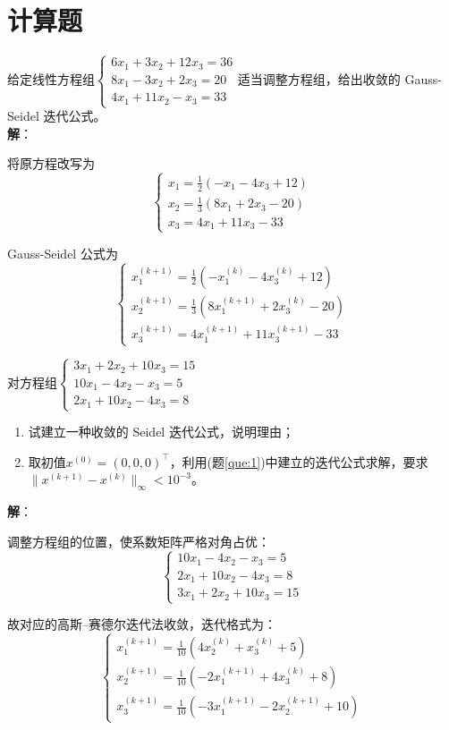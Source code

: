 \documentclass[UTF8,a4paper,11pt,oneside]{ctexbook}
\begin{document}
\section{计算题}

给定线性方程组\(\begin{cases}
    6x_1+3x_2+12x_3=36\\
    8x_1-3x_2+2x_3=20\\
    4x_1+11x_2-x_3=33
\end{cases}\)适当调整方程组，给出收敛的 Gauss-Seidel 迭代公式。\\
\textbf{解}：

将原方程改写为
\[
\begin{cases}
    x_1=\frac{1}{2}(-x_1-4x_3+12)\\
    x_2=\frac{1}{3}(8x_1+2x_3-20)\\
    x_3=4x_1+11x_3-33
\end{cases}
\]

Gauss-Seidel 公式为
\[
\begin{cases}
    x_1^{(k+1)}=\frac{1}{2}(-x_1^{(k)}-4x_3^{(k)}+12)\\
    x_2^{(k+1)}=\frac{1}{3}(8x_1^{(k+1)}+2x_3^{(k)}-20)\\
    x_3^{(k+1)}=4x_1^{(k+1)}+11x_3^{(k+1)}-33
\end{cases}
\]

\vspace{4em}
对方程组\(\begin{cases}
    3x_1+2x_2+10x_3=15\\
    10x_1-4x_2-x_3=5\\
    2x_1+10x_2-4x_3=8
\end{cases}\)
\begin{enumerate}
    \item 试建立一种收敛的 Seidel 迭代公式，说明理由；\label{que:1}
    \item 取初值\(x^{(0)}=(0,0,0)^\top\)，利用(题\ref{que:1})中建立的迭代公式求解，要求\(\|x^{(k+1)}-x^{(k)}\|_\infty<10^{-3}\)。
\end{enumerate}
\textbf{解}：

调整方程组的位置，使系数矩阵严格对角占优：
\[
\begin{cases}
    10x_1-4x_2-x_3=5\\
    2x_1+10x_2-4x_3=8\\
    3x_1+2x_2+10x_3=15
\end{cases}
\]

故对应的高斯--赛德尔迭代法收敛，迭代格式为：
\[
\begin{cases}
    x_1^{(k+1)}=\frac{1}{10}(4x_2^{(k)}+x_3^{(k)}+5)\\
    x_2^{(k+1)}=\frac{1}{10}(-2x_1^{(k+1)}+4x_3^{(k)}+8)\\
    x_3^{(k+1)}=\frac{1}{10}(-3x_1^{(k+1)}-2x_2^{(k+1)}+10)
\end{cases}
\]
\end{document}
